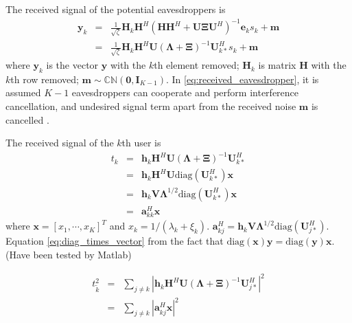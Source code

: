 \documentclass[12pt,journal,draftclsnofoot,onecolumn]{IEEEtran}
\begin{document}
The received signal of the potential eavesdroppers is 
\begin{eqnarray}
\mathbf{y}_k &=& \frac{1}{\sqrt{\zeta}}\mathbf{H}_k\mathbf{H}^H\left(\mathbf{H}\mathbf{H}^H + \mathbf{U}\mathbf{\Xi}\mathbf{U}^H\right)^{-1}\mathbf{e}_ks_k + \mathbf{m}\\
&=&\frac{1}{\sqrt{\zeta}}\mathbf{H}_k\mathbf{H}^H\mathbf{U}\left(\mathbf{\Lambda} + \mathbf{\Xi}\right)^{-1}\mathbf{U}_{k*}^Hs_k + \mathbf{m} \label{eq:received_eavesdropper}
\end{eqnarray}
where $\mathbf{y}_k$ is the vector $\mathbf{y}$ with the $k$th element removed; $\mathbf{H}_k$ is matrix $\mathbf{H}$ with the $k$th row removed; $\mathbf{m} \sim \mathbb{C}\mathbb{N}(\mathbf{0},\mathbf{I}_{K-1})$.
In \eqref{eq:received_eavesdropper}, it is assumed $K-1$ eavesdroppers can cooperate and perform interference cancellation, and undesired signal term apart from the received noise $\mathbf{m}$ is cancelled \cite{geraci2012secrecy}.

The received signal of the $k$th user is 
\begin{eqnarray}
t_k &=& \mathbf{h}_k\mathbf{H}^H\mathbf{U}\left(\mathbf{\Lambda} + \mathbf{\Xi}\right)^{-1}\mathbf{U}_{k*}^H\\
& = &\mathbf{h}_k\mathbf{H}^H\mathbf{U}\mathrm{diag}(\mathbf{U}_{k*}^H)\mathbf{x}\\
&=& \mathbf{h}_k\mathbf{V}\mathbf{\Lambda}^{1/2}\mathrm{diag}(\mathbf{U}_{k*}^H)\mathbf{x} \label{eq:diag_times_vector}\\
&=& \mathbf{a}_{kk}^H\mathbf{x}
\end{eqnarray}
where $\mathbf{x} = [x_1,\cdots,x_K]^T$ and $x_k = 1/(\lambda_k + \xi_k)$. $\mathbf{a}_{kj}^H = \mathbf{h}_k\mathbf{V}\mathbf{\Lambda}^{1/2}\mathrm{diag}(\mathbf{U}_{j*}^H)$.
Equation \ref{eq:diag_times_vector} from the fact that $\mathrm{diag}(\mathbf{x})\mathbf{y} = \mathrm{diag}(\mathbf{y})\mathbf{x}$. (Have been tested by Matlab)


\begin{eqnarray}
t_{\tilde{k}}^2 &=& \sum_{j \neq k}|\mathbf{h}_k\mathbf{H}^H\mathbf{U}\left(\mathbf{\Lambda} + \mathbf{\Xi}\right)^{-1}\mathbf{U}_{j*}^H|^2\\
&=&\sum_{j \neq k}|\mathbf{a}_{kj}^H\mathbf{x}|^2
\end{eqnarray}
\end{document}
